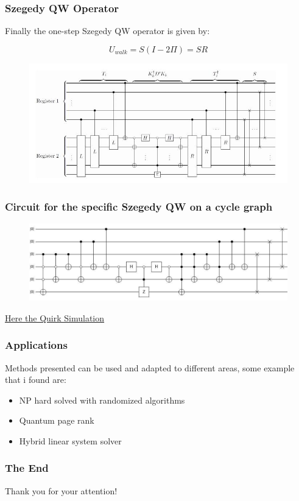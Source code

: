 \documentclass{beamer}
\begin{document}
\begin{frame}
    \frametitle{Szegedy QW Operator}
    Finally the one-step Szegedy QW operator is given by:
    
    \begin{equation}
        U_{walk} = S(I - 2\varPi) = SR
    \end{equation}

    \begin{figure}[h!]
        \includegraphics[scale=0.5]{img/generic_szegedy.jpg}
        \centering
    \end{figure}
\end{frame}

\begin{frame}
    \frametitle{Circuit for the specific Szegedy QW on a cycle graph}
    \begin{figure}[h!]
        \includegraphics[scale=0.4]{img/szegedy_c8.jpg}
        \centering
    \end{figure}
    \href{https://bit.ly/2X3PvAk}{Here the Quirk Simulation}
\end{frame}

\begin{frame}
    \frametitle{Applications}
    Methods presented can be used and adapted to different areas, some 
    example that i found are:
    \begin{itemize}
        \item NP hard solved with randomized algorithms
        \item Quantum page rank
        \item Hybrid linear system solver
    \end{itemize}
\end{frame}

\begin{frame}
    \frametitle{The End}

    Thank you for your attention!

\end{frame}
\end{document}
